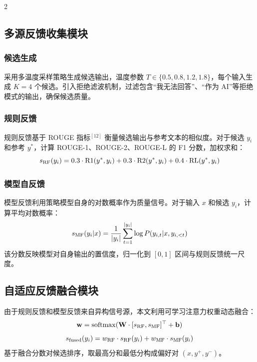 \documentclass{aas}
\begin{document}
\begin{multicols}{2}
\subsection{多源反馈收集模块}

\subsubsection{候选生成}

采用多温度采样策略生成候选输出，温度参数 $T \in \{0.5, 0.8, 1.2, 1.8\}$，每个输入生成 $K=4$ 个候选。引入拒绝滤波机制，过滤包含``我无法回答''、``作为 AI''等拒绝模式的输出，确保候选质量。

\subsubsection{规则反馈}

规则反馈基于 ROUGE 指标$^{[12]}$ 衡量候选输出与参考文本的相似度。对于候选 $y_i$ 和参考 $y^*$，计算 ROUGE-1、ROUGE-2、ROUGE-L 的 F1 分数，加权求和：
\begin{equation}
    s_{\rm RF}(y_i) = 0.3 \cdot {\rm R1}(y^*, y_i) + 0.3 \cdot {\rm R2}(y^*, y_i) + 0.4 \cdot {\rm RL}(y^*, y_i)
\end{equation}

\subsubsection{模型自反馈}

模型反馈利用策略模型自身的对数概率作为质量信号。对于输入 $x$ 和候选 $y_i$，计算平均对数概率：
\begin{equation}
    s_{\rm MF}(y_i|x) = \frac{1}{|y_i|} \sum_{t=1}^{|y_i|} \log P(y_{i,t} | x, y_{i,<t})
\end{equation}
该分数反映模型对自身输出的置信度，归一化到 $[0,1]$ 区间与规则反馈统一尺度。

\subsection{自适应反馈融合模块}

由于规则反馈和模型反馈来自异构信号源，本文利用可学习注意力权重动态融合：
\begin{equation}
    \mathbf{w} = {\rm softmax}(\mathbf{W} \cdot [s_{\rm RF}, s_{\rm MF}]^\top + \mathbf{b})
\end{equation}
\begin{equation}
    s_{\rm fused}(y_i) = w_{\rm RF} \cdot s_{\rm RF}(y_i) + w_{\rm MF} \cdot s_{\rm MF}(y_i)
\end{equation}
基于融合分数对候选排序，取最高分和最低分构成偏好对 $(x, y^+, y^-)$。


\end{multicols}
\end{document}
